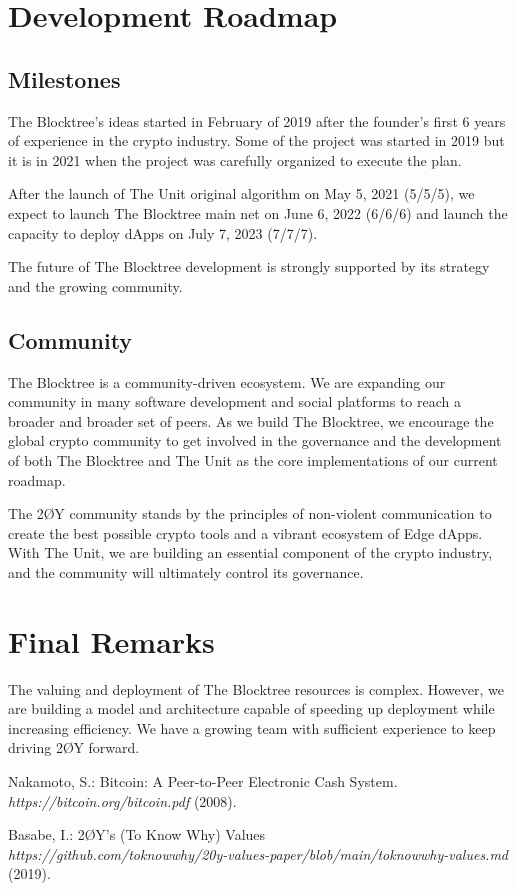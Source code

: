 \documentclass[12pt]{article}
\begin{document}
  
\section{Development Roadmap}


\subsection{Milestones}

The Blocktree's ideas started in February of 2019 after the founder's first 6 years of experience in the crypto industry. Some of the project was started in 2019 but it is in 2021 when the project was carefully organized to execute the plan.

After the launch of The Unit original algorithm on May 5, 2021 (5/5/5), we expect to launch The Blocktree main net on June 6, 2022 (6/6/6) and launch the capacity to deploy dApps on July 7, 2023 (7/7/7).

The future of The Blocktree development is strongly supported by its strategy and the growing community.


\subsection{Community}

The Blocktree is a community-driven ecosystem. We are expanding our community in many software development and social platforms to reach a broader and broader set of peers. As we build The Blocktree, we encourage the global crypto community to get involved in the governance and the development of both The Blocktree and The Unit as the core implementations of our current roadmap.

The 2ØY community stands by the principles of non-violent communication to create the best possible crypto tools and a vibrant ecosystem of Edge dApps. With The Unit, we are building an essential component of the crypto industry, and the community will ultimately control its governance.

\section{Final Remarks}

The valuing and deployment of The Blocktree resources is complex. However, we are building a model and architecture capable of speeding up deployment while increasing efficiency. We have a growing team with sufficient experience to keep driving 2ØY forward.


\begin{thebibliography}{[BLSWZ9]}


 Nakamoto, S.: Bitcoin: A Peer-to-Peer Electronic Cash System. \emph{https://bitcoin.org/bitcoin.pdf} (2008).


 Basabe, I.: 2ØY's (To Know Why) Values \\ \emph{https://github.com/toknowwhy/20y-values-paper/blob/main/toknowwhy-values.md} (2019).


\end{thebibliography}
\end{document}

